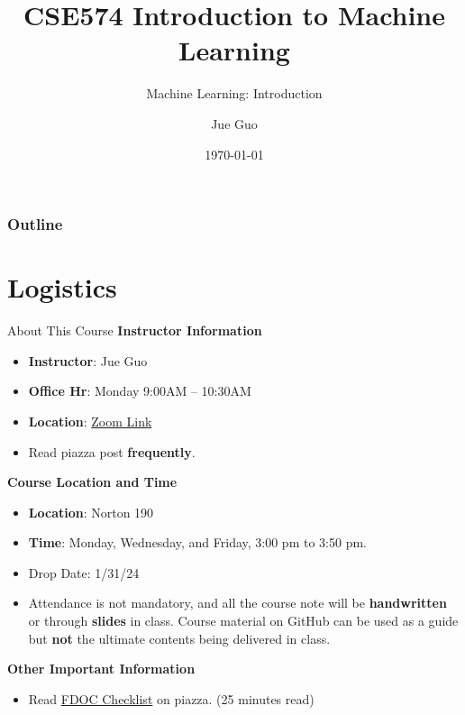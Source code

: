 \documentclass[10pt,dvipsnames]{beamer}
\title{CSE574 Introduction to Machine Learning}
\subtitle{Machine Learning: Introduction}
\author{Jue Guo}
\institute{University at Buffalo}
\date{\today}
\begin{document}
\begin{frame}
    \titlepage
\end{frame}

\begin{frame}
    \frametitle{Outline}
    \tableofcontents
\end{frame}
\section{Logistics}
\begin{frame}{About This Course}
    \textbf{Instructor Information}
    \begin{itemize}
        \item \textbf{Instructor}: Jue Guo
        \item \textbf{Office Hr}: Monday 9:00AM -- 10:30AM
        \item \textbf{Location}: \href{https://buffalo.zoom.us/j/7673733717?pwd=TktTVXlDOGgxM3dRUC9UT21hNEdOQT09&omn=92002344719}{Zoom Link}
        \item Read piazza post \textbf{frequently}.
    \end{itemize}
    \textbf{Course Location and Time}
    \begin{itemize}
        \item \textbf{Location}: Norton 190
        \item \textbf{Time}: Monday, Wednesday, and Friday, 3:00 pm to 3:50 pm.
        \item Drop Date: 1/31/24
        \item Attendance is not mandatory, and all the course note will be \textbf{handwritten} or through \textbf{slides} in class. Course material on GitHub can be used as a guide but \textbf{not} the ultimate contents being delivered in class.
    \end{itemize}
    \textbf{Other Important Information}
    \begin{itemize}
        \item Read \href{https://piazza.com/class/lq6pes9vr0v135/post/20}{FDOC Checklist} on piazza. (25 minutes read)
    \end{itemize}

\end{frame}
\end{document}
